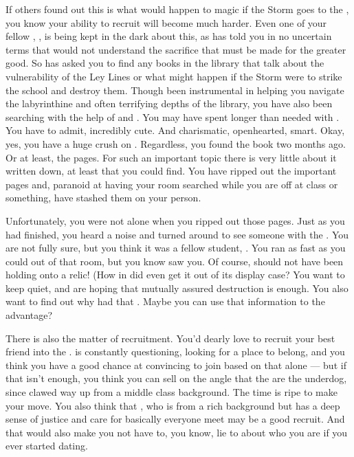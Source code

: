 \documentclass[char]{GL2020}
\begin{document}
If others found out this is what would happen to magic if the Storm goes to the \pSchool{}, you know your ability to recruit will become much harder. Even one of your fellow \pGoaties{}, \cChupInventor{\full}, is being kept in the dark about this, as \cChupSecond{} has told you in no uncertain terms that \cChupInventor{\they} would not understand the sacrifice that must be made for the greater good. So \cChupSecond{} has asked you to find any books in the library that talk about the vulnerability of the Ley Lines or what might happen if the Storm were to strike the school and destroy them. Though \cChupSecond{\theyhave} been instrumental in helping you navigate the labyrinthine and often terrifying depths of the library, you have also been searching with the help of \cAmbition{} and \cPresident{}. You may have spent longer than needed with \cPresident{}. You have to admit, \cPresident{\theyare} incredibly cute. And charismatic, openhearted, smart. Okay, yes, you have a huge crush on \cPresident{\them}. Regardless, you found the book two months ago. Or at least, the pages. For such an important topic there is very little about it written down, at least that you could find. You have ripped out the important pages and, paranoid at having your room searched while you are off at class or something, have stashed them on your person. 

Unfortunately, you were not alone when you ripped out those pages. Just as you had finished, you heard a noise and turned around to see someone with the \iScythe{}. You are not fully sure, but you think it was a fellow student, \cScholarship{\intro}. You ran as fast as you could out of that room, but you know \cScholarship{\they} saw you. Of course, \cScholarship{} should not have been holding onto a relic! (How in \pEarth{} did \cScholarship{\they} even get it out of its display case? You want to keep \cScholarship{\them} quiet, and are hoping that mutually assured destruction is enough. You also want to find out why \cScholarship{\they} had that \iScythe{}. Maybe you can use that information to the \pGoaties{} advantage? 
 
There is also the matter of recruitment. You'd dearly love to recruit your best friend \cAmbition{} into the \pGoaties{}. \cAmbition{} is constantly questioning, looking for a place to belong, and you think you have a good chance at convincing \cAmbition{\them} to join based on that alone — but if that isn't enough, you think you can sell \cAmbition{\them} on the angle that the \pGoaties{} are the underdog, since \cAmbition{} clawed \cAmbition{\their} way up from a middle class background. The time is ripe to make your move. You also think that \cPresident{}, who is from a rich background but has a deep sense of justice and care for basically everyone \cPresident{\they} meet may be a good recruit. And that would also make you not have to, you know, lie to \cPresident{} about who you are if you ever started dating. 
 
\end{document}
